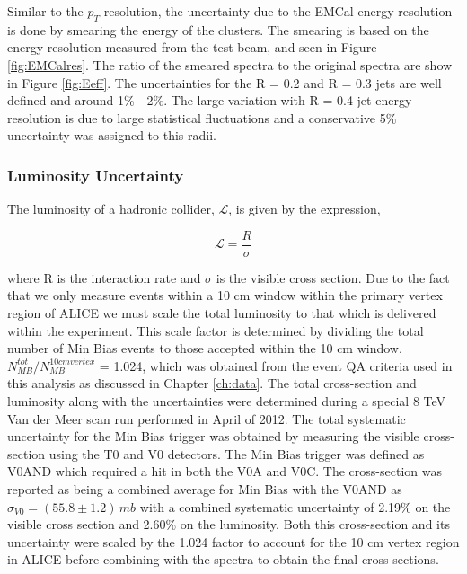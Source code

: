 Similar to the $p_{T}$ resolution, the uncertainty due to the EMCal energy resolution is done by smearing the energy of the clusters.  The smearing is based on the energy resolution measured from the test beam, and seen in Figure \ref{fig:EMCalres}.  The ratio of the smeared spectra to the original spectra are show in Figure \ref{fig:Eeff}. The uncertainties for the R = 0.2 and R = 0.3 jets are well defined and around 1\% - 2\%.  The large variation with R = 0.4 jet energy resolution is due to large statistical fluctuations and a conservative 5\% uncertainty was assigned to this radii.

\subsubsection{Luminosity Uncertainty}

The luminosity of a hadronic collider, $\mathscr{L}$, is given by the expression,



\begin{equation}
\mathscr{L} = \frac{R}{\sigma}
\label{eq:xlumdef}
\end{equation}

\noindent
where R is the interaction rate and $\sigma$ is the visible cross section.  Due to the fact that we only measure events within a 10 cm window within the primary vertex region of ALICE we must scale the total luminosity to that which is delivered within the experiment.  This scale factor is determined by dividing the total number of Min Bias events to those accepted within the 10 cm window.  $N^{tot}_{MB} / N^{10 cm vertex}_{MB}$ = 1.024, which was obtained from the event QA criteria used in this analysis as discussed in Chapter \ref{ch:data}.
The total cross-section and luminosity along with the uncertainties were determined during a special 8 TeV Van der Meer scan run performed in April of 2012\cite{ALICE-PUBLIC-2017-002}.  The total systematic uncertainty for the Min Bias trigger was obtained by measuring the visible cross-section using the T0 and V0 detectors.  The Min Bias trigger was defined as V0AND which required a hit in both the V0A and V0C.  The cross-section was reported as being a combined average for Min Bias with the V0AND as $\sigma_{V0} = (55.8 \pm 1.2) \, mb$ with a combined systematic uncertainty of 2.19\% on the visible cross section and 2.60\% on the luminosity.  Both this cross-section and its uncertainty were scaled by the 1.024 factor to account for the 10 cm vertex region in ALICE before combining with the spectra to obtain the final cross-sections.


